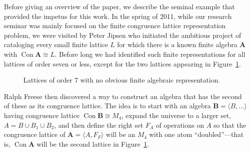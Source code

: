 \documentclass{au}
\numberwithin{equation}{section}
\theoremstyle{plain}
\theoremstyle{definition}
\newcommand{\<}{\ensuremath{\langle}}
\renewcommand{\>}{\ensuremath{\rangle}}
\newcommand{\bA}{\ensuremath{\mathbf{A}}}
\newcommand{\bB}{\ensuremath{\mathbf{B}}}
\DeclareMathOperator{\Con}{Con}
\newcommand{\dotsize}{1.0pt}%
\begin{document}
Before giving an overview of the paper, we describe the seminal example that
provided the impetus for this work.  In the spring of 2011, while our research
seminar was mainly focused on the finite congruence lattice representation
problem, we were visited by Peter Jipsen who initiated the ambitious project of
cataloging every small finite lattice $L$ for which there is a known finite
algebra $\bA$ with $\Con\bA\cong L$.  Before long we had identified such finite
representations for all lattices of order seven or less, except for the two
lattices appearing in Figure~\ref{fig:sevens}.
\begin{figure}[h!]
  \centering


  \caption{Lattices of order 7 with no obvious finite algebraic representation.}
  \label{fig:sevens}
\end{figure}
Ralph Freese then discovered a way to construct an algebra
that has the second of these as its congruence lattice. The idea
is to start with an algebra $\bB = \<B, \dots\>$ having congruence lattice $\Con \bB
\cong M_4$, expand the universe to a larger set, $A = B\cup B_1 \cup B_2$, and
then define the right set $F_A$ of operations on $A$ so that the congruence lattice
of $\bA = \< A, F_F\>$ will be an $M_4$ with one atom 
``doubled''---that is,
$\Con\bA$ will be the second lattice in Figure~\ref{fig:sevens}.
\end{document}
